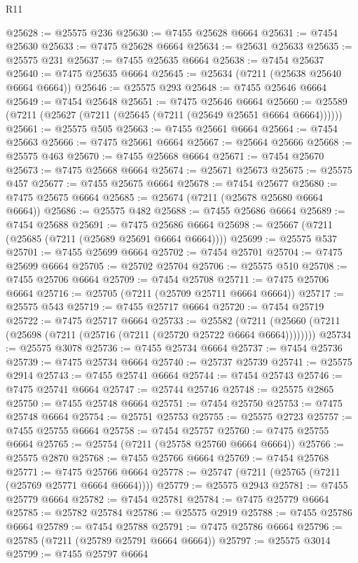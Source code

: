 \begin{lexlean}{R11}
\begin{coremodule}
@25628 := @25575 @236
@25630 := @7455 @25628 @6664
@25631 := @7454 @25630
@25633 := @7475 @25628 @6664
@25634 := @25631 @25633
@25635 := @25575 @231
@25637 := @7455 @25635 @6664
@25638 := @7454 @25637
@25640 := @7475 @25635 @6664
@25645 := @25634 (@7211 (@25638 @25640 @6664 @6664))
@25646 := @25575 @293
@25648 := @7455 @25646 @6664
@25649 := @7454 @25648
@25651 := @7475 @25646 @6664
@25660 := @25589 (@7211 (@25627 (@7211 (@25645 (@7211 (@25649 @25651 @6664 @6664))))))
@25661 := @25575 @505
@25663 := @7455 @25661 @6664
@25664 := @7454 @25663
@25666 := @7475 @25661 @6664
@25667 := @25664 @25666
@25668 := @25575 @463
@25670 := @7455 @25668 @6664
@25671 := @7454 @25670
@25673 := @7475 @25668 @6664
@25674 := @25671 @25673
@25675 := @25575 @457
@25677 := @7455 @25675 @6664
@25678 := @7454 @25677
@25680 := @7475 @25675 @6664
@25685 := @25674 (@7211 (@25678 @25680 @6664 @6664))
@25686 := @25575 @482
@25688 := @7455 @25686 @6664
@25689 := @7454 @25688
@25691 := @7475 @25686 @6664
@25698 := @25667 (@7211 (@25685 (@7211 (@25689 @25691 @6664 @6664))))
@25699 := @25575 @537
@25701 := @7455 @25699 @6664
@25702 := @7454 @25701
@25704 := @7475 @25699 @6664
@25705 := @25702 @25704
@25706 := @25575 @510
@25708 := @7455 @25706 @6664
@25709 := @7454 @25708
@25711 := @7475 @25706 @6664
@25716 := @25705 (@7211 (@25709 @25711 @6664 @6664))
@25717 := @25575 @543
@25719 := @7455 @25717 @6664
@25720 := @7454 @25719
@25722 := @7475 @25717 @6664
@25733 := @25582
    (@7211 (@25660 (@7211 (@25698 (@7211 (@25716 (@7211 (@25720 @25722 @6664 @6664))))))))
@25734 := @25575 @3078
@25736 := @7455 @25734 @6664
@25737 := @7454 @25736
@25739 := @7475 @25734 @6664
@25740 := @25737 @25739
@25741 := @25575 @2914
@25743 := @7455 @25741 @6664
@25744 := @7454 @25743
@25746 := @7475 @25741 @6664
@25747 := @25744 @25746
@25748 := @25575 @2865
@25750 := @7455 @25748 @6664
@25751 := @7454 @25750
@25753 := @7475 @25748 @6664
@25754 := @25751 @25753
@25755 := @25575 @2723
@25757 := @7455 @25755 @6664
@25758 := @7454 @25757
@25760 := @7475 @25755 @6664
@25765 := @25754 (@7211 (@25758 @25760 @6664 @6664))
@25766 := @25575 @2870
@25768 := @7455 @25766 @6664
@25769 := @7454 @25768
@25771 := @7475 @25766 @6664
@25778 := @25747 (@7211 (@25765 (@7211 (@25769 @25771 @6664 @6664))))
@25779 := @25575 @2943
@25781 := @7455 @25779 @6664
@25782 := @7454 @25781
@25784 := @7475 @25779 @6664
@25785 := @25782 @25784
@25786 := @25575 @2919
@25788 := @7455 @25786 @6664
@25789 := @7454 @25788
@25791 := @7475 @25786 @6664
@25796 := @25785 (@7211 (@25789 @25791 @6664 @6664))
@25797 := @25575 @3014
@25799 := @7455 @25797 @6664

\end{coremodule}
\end{lexlean}
